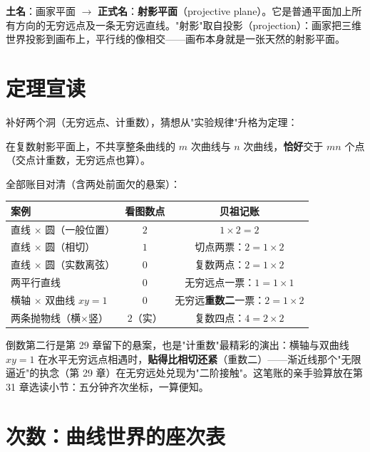 \begin{faming}
\textbf{土名}：画家平面 $\to$ \textbf{正式名}：\textbf{射影平面}（projective plane）。它是普通平面加上所有方向的无穷远点及一条无穷远直线。"射影"取自投影（projection）：画家把三维世界投影到画布上，平行线的像相交——画布本身就是一张天然的射影平面。
\end{faming}

\section{定理宣读}

补好两个洞（无穷远点、计重数），猜想从"实验规律"升格为定理：

\begin{dingli}[贝祖定理，1779]
在复数射影平面上，不共享整条曲线的 $m$ 次曲线与 $n$ 次曲线，\textbf{恰好}交于 $mn$ 个点（交点计重数，无穷远点也算）。
\end{dingli}

全部账目对清（含两处前面欠的悬案）：

\begin{center}
\begin{tabular}{lcc}
\toprule
案例 & 看图数点 & 贝祖记账 \\
\midrule
直线 $\times$ 圆（一般位置） & $2$ & $1\times2 = 2$ \\
直线 $\times$ 圆（相切） & $1$ & 切点两票：$2 = 1\times2$ \\
直线 $\times$ 圆（实数离弦） & $0$ & 复数两点：$2 = 1\times2$ \\
两平行直线 & $0$ & 无穷远点一票：$1 = 1\times1$ \\
横轴 $\times$ 双曲线 $xy=1$ & $0$ & 无穷远\textbf{重数二}一票：$2 = 1\times2$ \\
两条抛物线（横$\times$竖） & $2$（实） & 复数四点：$4 = 2\times2$ \\
\bottomrule
\end{tabular}
\end{center}

倒数第二行是第 29 章留下的悬案，也是"计重数"最精彩的演出：横轴与双曲线 $xy = 1$ 在水平无穷远点相遇时，\textbf{贴得比相切还紧}（重数二）——渐近线那个"无限逼近"的执念（第 29 章）在无穷远处兑现为"二阶接触"。这笔账的亲手验算放在第 31 章选读小节：五分钟齐次坐标，一算便知。

\section{次数：曲线世界的座次表}

